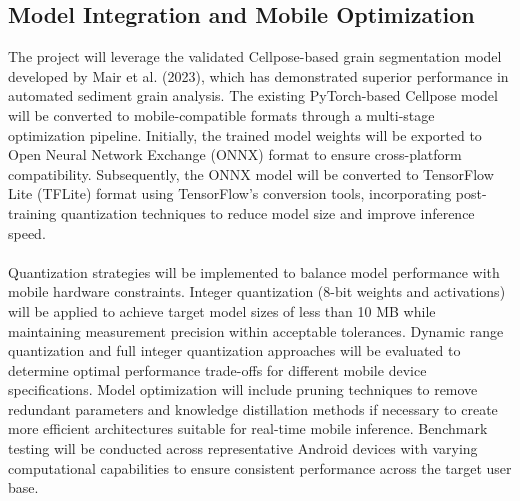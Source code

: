 \documentclass[project-plan]{report-template}
\begin{document}
\subsection{Model Integration and Mobile Optimization}
The project will leverage the validated Cellpose-based grain segmentation model developed by Mair et al. (2023), which has demonstrated superior performance in automated sediment grain analysis. The existing PyTorch-based Cellpose model will be converted to mobile-compatible formats through a multi-stage optimization pipeline. Initially, the trained model weights will be exported to Open Neural Network Exchange (ONNX) format to ensure cross-platform compatibility. Subsequently, the ONNX model will be converted to TensorFlow Lite (TFLite) format using TensorFlow's conversion tools, incorporating post-training quantization techniques to reduce model size and improve inference speed.\\\\
Quantization strategies will be implemented to balance model performance with mobile hardware constraints. Integer quantization (8-bit weights and activations) will be applied to achieve target model sizes of less than 10 MB while maintaining measurement precision within acceptable tolerances. Dynamic range quantization and full integer quantization approaches will be evaluated to determine optimal performance trade-offs for different mobile device specifications.
Model optimization will include pruning techniques to remove redundant parameters and knowledge distillation methods if necessary to create more efficient architectures suitable for real-time mobile inference. Benchmark testing will be conducted across representative Android devices with varying computational capabilities to ensure consistent performance across the target user base.



\end{document}
